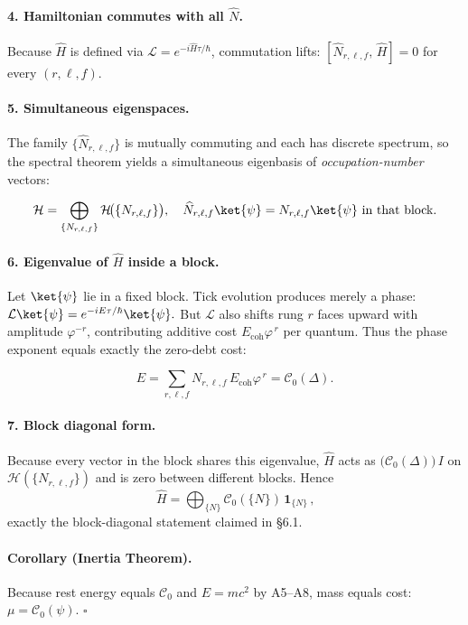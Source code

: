 \documentclass[11pt]{article}
\begin{document}
\paragraph{4. Hamiltonian commutes with all $\widehat N$.}
Because $\widehat H$ is defined via
$\mathcal L = e^{-i\widehat H\tau/\hbar}$,
commutation lifts:
\(
[\widehat N_{r,\ell,f},\,\widehat H]=0
\)
for every $(r,\ell,f)$.

\paragraph{5. Simultaneous eigenspaces.}
The family $\{\widehat N_{r,\ell,f}\}$ is mutually commuting and each
has discrete spectrum, so the spectral theorem yields a simultaneous
eigenbasis of \emph{occupation-number} vectors:

\[
\mathcal H = \bigoplus_{\{N_{r,\ell,f}\}}
\mathcal H\!\bigl(\{N_{r,\ell,f}\}\bigr),
\quad
\widehat N_{r,\ell,f}\ket{\psi}
  = N_{r,\ell,f}\ket{\psi}\ \text{in that block.}
\]

\paragraph{6. Eigenvalue of $\widehat H$ inside a block.}
Let $\ket{\psi}$ lie in a fixed block.  
Tick evolution produces merely a phase:
\(
\mathcal L\ket{\psi}=e^{-iE\tau/\hbar}\ket{\psi}.
\)
But $\mathcal L$ also shifts rung $r$ faces upward with amplitude
$\varphi^{-r}$, contributing additive cost
$E_{\text{coh}}\varphi^{\,r}$ per quantum.  
Thus the phase exponent equals exactly the zero-debt cost:

\[
E
  = \sum_{r,\ell,f} N_{r,\ell,f}\,E_{\text{coh}}\varphi^{\,r}
  = \mathcal C_{0}(\Delta).
\]

\paragraph{7. Block diagonal form.}
Because every vector in the block shares this eigenvalue,
$\widehat H$ acts as
\(
\bigl(\mathcal C_{0}(\Delta)\bigr)\,I
\)
on $\mathcal H(\{N_{r,\ell,f}\})$ and is zero between different blocks.
Hence
\[
\boxed{\,
\widehat H
  = \bigoplus_{\{N\}}
    \mathcal C_{0}(\{N\})\,\mathbf 1_{\{N\}}
\,},
\]
exactly the block-diagonal statement claimed in §6.1.

\paragraph{Corollary (Inertia Theorem).}
Because rest energy equals $\mathcal C_{0}$ and $E=mc^{2}$ by A5–A8,
mass equals cost: $\mu=\mathcal C_{0}(\psi)$. \(\square\)
\end{document}
